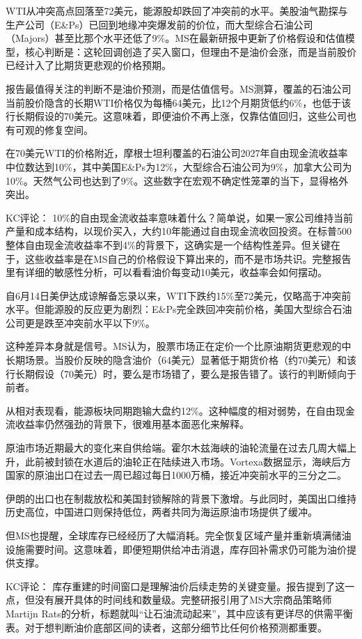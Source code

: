 \documentclass[11pt]{ctexart}
\begin{document}
WTI从冲突高点回落至72美元，能源股却跌回了冲突前的水平。美股油气勘探与生产公司（E\&Ps）已回到地缘冲突爆发前的价位，而大型综合石油公司（Majors）甚至比那个水平还低了9\%。MS在最新研报中更新了价格假设和估值模型，核心判断是：这轮回调创造了买入窗口，但理由不是油价会涨，而是当前股价已经计入了比期货更悲观的价格预期。

报告最值得关注的判断不是油价预测，而是估值信号。MS测算，覆盖的石油公司当前股价隐含的长期WTI价格仅为每桶64美元，比12个月期货低约6\%，也低于该行长期假设的70美元。这意味着，即便油价不再上涨，仅靠估值回归，这些公司也有可观的修复空间。

在70美元WTI的价格附近，摩根士坦利覆盖的石油公司2027年自由现金流收益率中位数达到10\%，其中美国E\&Ps为12\%，大型综合石油公司为9\%，加拿大公司为10\%。天然气公司也达到了9\%。这些数字在宏观不确定性笼罩的当下，显得格外突出。

KC评论： 10\%的自由现金流收益率意味着什么？简单说，如果一家公司维持当前产量和成本结构，以现价买入，大约10年能通过自由现金流收回投资。在标普500整体自由现金流收益率不到4\%的背景下，这确实是一个结构性差异。但关键在于，这些收益率是在MS自己的价格假设下算出来的，而不是市场共识。完整报告里有详细的敏感性分析，可以看看油价每变动10美元，收益率会如何摆动。

自6月14日美伊达成谅解备忘录以来，WTI下跌约15\%至72美元，仅略高于冲突前水平。但能源股的反应更为剧烈：E\&Ps完全跌回冲突前价格，美国大型综合石油公司更是跌至冲突前水平以下9\%。

这种差异本身就是信号。MS认为，股票市场正在定价一个比原油期货更悲观的中长期场景。当股价反映的隐含油价（64美元）显著低于期货价格（约70美元）和该行长期假设（70美元）时，要么是市场错了，要么是报告错了。该行的判断倾向于前者。

从相对表现看，能源板块同期跑输大盘约12\%。这种幅度的相对弱势，在自由现金流收益率仍然强劲的背景下，很难用基本面恶化来解释。

原油市场近期最大的变化来自供给端。霍尔木兹海峡的油轮流量在过去几周大幅上升，此前被封锁在水道后的油轮正在陆续进入市场。Vortexa数据显示，海峡后方国家的原油出口在过去一周已超过每日1000万桶，接近冲突前水平的三分之二。

伊朗的出口也在制裁放松和美国封锁解除的背景下激增。与此同时，美国出口维持历史高位，中国进口则保持低位，两者共同为海运原油市场提供了缓冲。

但MS也提醒，全球库存已经经历了大幅消耗。完全恢复区域产量并重新填满储油设施需要时间。这意味着，即便短期供给冲击消退，库存回补需求仍可能为油价提供支撑。

KC评论： 库存重建的时间窗口是理解油价后续走势的关键变量。报告提到了这一点，但没有展开具体的时间线和数量级。完整研报引用了MS大宗商品策略师Martijn Rats的分析，标题就叫“让石油流动起来”，其中应该有更详尽的供需平衡表。对于想判断油价底部区间的读者，这部分细节比任何价格预测都重要。
\end{document}
